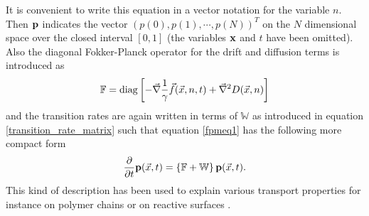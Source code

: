 It is convenient to write this equation in a vector notation for the variable $n$. Then $\boldsymbol{\mathbf{p}}$ indicates the vector $(p(0),p(1),\cdots,p(N))^{T}$ on the $N$ dimensional space over the closed interval $[0,1]$ (the variables $\boldsymbol{\mathbf{x}}$ and $t$ have been omitted). \\ 
Also the diagonal Fokker-Planck operator for the drift and diffusion terms is introduced as
\begin{equation}
    \mathbb{F} = {\rm diag} \left[- \vec{ \nabla } \frac{1}{\gamma}\vec{f}(\vec{x},n,t) + \vec{\nabla}^{2} D(\vec{x},n) \right]
    \label{fpo}
\end{equation}
and the transition rates are again written in terms of $\mathbb{W}$ as introduced in equation \eqref{transition_rate_matrix} such that equation \eqref{fpmeq1} has the following more compact form
\begin{equation}
    \frac{\partial}{\partial t} \boldsymbol{\mathbf{p}}(\vec{x},t) = \left\{ \mathbb{F} + \mathbb{W} \right\} \boldsymbol{\mathbf{p}}(\vec{x},t).
    \label{fpmeq2}
\end{equation}
This kind of description has been used to explain various transport properties for instance on polymer chains or on reactive surfaces \cite{Friedman1968,Caceres1990}.

